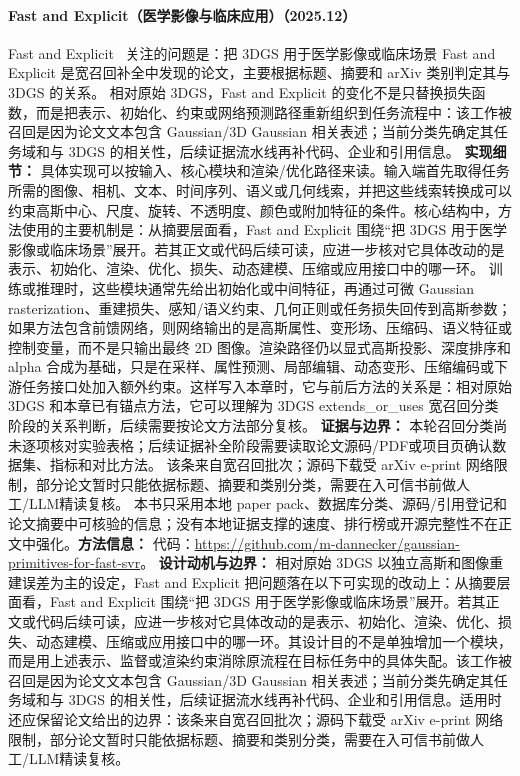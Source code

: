 \paragraph{Fast and Explicit（医学影像与临床应用）（2025.12）}
Fast and Explicit~\cite{2512_11624} 关注的问题是：把 3DGS 用于医学影像或临床场景 Fast and Explicit 是宽召回补全中发现的论文，主要根据标题、摘要和 arXiv 类别判定其与 3DGS 的关系。
相对原始 3DGS，Fast and Explicit 的变化不是只替换损失函数，而是把表示、初始化、约束或网络预测路径重新组织到任务流程中：该工作被召回是因为论文文本包含 Gaussian/3D Gaussian 相关表述；当前分类先确定其任务域和与 3DGS 的相关性，后续证据流水线再补代码、企业和引用信息。
\textbf{实现细节：} 具体实现可以按输入、核心模块和渲染/优化路径来读。输入端首先取得任务所需的图像、相机、文本、时间序列、语义或几何线索，并把这些线索转换成可以约束高斯中心、尺度、旋转、不透明度、颜色或附加特征的条件。核心结构中，方法使用的主要机制是：从摘要层面看，Fast and Explicit 围绕“把 3DGS 用于医学影像或临床场景”展开。若其正文或代码后续可读，应进一步核对它具体改动的是表示、初始化、渲染、优化、损失、动态建模、压缩或应用接口中的哪一环。 训练或推理时，这些模块通常先给出初始化或中间特征，再通过可微 Gaussian rasterization、重建损失、感知/语义约束、几何正则或任务损失回传到高斯参数；如果方法包含前馈网络，则网络输出的是高斯属性、变形场、压缩码、语义特征或控制变量，而不是只输出最终 2D 图像。渲染路径仍以显式高斯投影、深度排序和 alpha 合成为基础，只是在采样、属性预测、局部编辑、动态变形、压缩编码或下游任务接口处加入额外约束。这样写入本章时，它与前后方法的关系是：相对原始 3DGS 和本章已有锚点方法，它可以理解为 3DGS extends\_or\_uses 宽召回分类阶段的关系判断，后续需要按论文方法部分复核。
\textbf{证据与边界：} 本轮召回分类尚未逐项核对实验表格；后续证据补全阶段需要读取论文源码/PDF或项目页确认数据集、指标和对比方法。 该条来自宽召回批次；源码下载受 arXiv e-print 网络限制，部分论文暂时只能依据标题、摘要和类别分类，需要在入可信书前做人工/LLM精读复核。 本书只采用本地 paper pack、数据库分类、源码/引用登记和论文摘要中可核验的信息；没有本地证据支撑的速度、排行榜或开源完整性不在正文中强化。\textbf{方法信息：} 代码：\url{https://github.com/m-dannecker/gaussian-primitives-for-fast-svr}。
\textbf{设计动机与边界：} 相对原始 3DGS 以独立高斯和图像重建误差为主的设定，Fast and Explicit 把问题落在以下可实现的改动上：从摘要层面看，Fast and Explicit 围绕“把 3DGS 用于医学影像或临床场景”展开。若其正文或代码后续可读，应进一步核对它具体改动的是表示、初始化、渲染、优化、损失、动态建模、压缩或应用接口中的哪一环。其设计目的不是单独增加一个模块，而是用上述表示、监督或渲染约束消除原流程在目标任务中的具体失配。该工作被召回是因为论文文本包含 Gaussian/3D Gaussian 相关表述；当前分类先确定其任务域和与 3DGS 的相关性，后续证据流水线再补代码、企业和引用信息。适用时还应保留论文给出的边界：该条来自宽召回批次；源码下载受 arXiv e-print 网络限制，部分论文暂时只能依据标题、摘要和类别分类，需要在入可信书前做人工/LLM精读复核。
